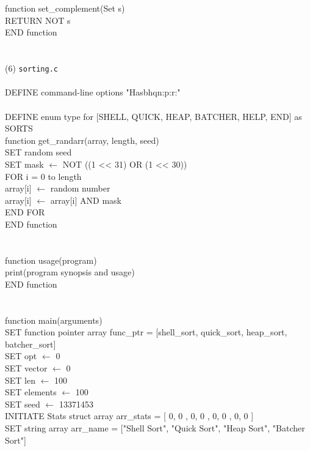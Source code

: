 \documentclass[12pt]{article}
\begin{document}
\\
\\
function set\_complement(Set s) \\
\indent RETURN NOT s \\
END function \\
\\
\\
(6) \texttt{sorting.c} \\
\\
DEFINE command-line options "Hasbhqn:p:r:" \\
\\
DEFINE enum type for [SHELL, QUICK, HEAP, BATCHER, HELP, END] as SORTS
\\
function get\_randarr(array, length, seed) \\
\indent SET random seed \\
\indent SET mask $\leftarrow$ NOT ((1 << 31) OR (1 << 30)) \\
\indent FOR i = 0 to length \\
\indent \indent array[i] $\leftarrow$ random number \\
\indent \indent array[i] $\leftarrow$ array[i] AND mask \\
\indent END FOR \\
END function \\
\\
\\
function usage(program) \\
\indent print(program synopsis and usage) \\
END function \\
\\
\\
function main(arguments) \\
\indent SET function pointer array func\_ptr = [shell\_sort, quick\_sort, heap\_sort, batcher\_sort] \\
\indent SET opt $\leftarrow$ 0 \\
\indent SET vector $\leftarrow$ 0 \\
\indent SET len $\leftarrow$ 100 \\
\indent SET elements $\leftarrow$ 100 \\
\indent SET seed $\leftarrow$ 13371453 \\
\indent INITIATE Stats struct array arr\_stats = [{ 0, 0 }, { 0, 0 }, { 0, 0 }, { 0, 0 }] \\
\indent SET string array arr\_name = ["Shell Sort", "Quick Sort", "Heap Sort", "Batcher Sort"] \\
\end{document}
